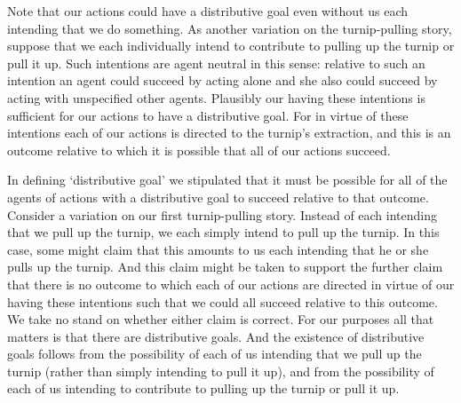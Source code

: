 \documentclass[12pt,\papersize]{extarticle}
\begin{document}

Note that our actions could have a distributive goal even without us each intending that we do something.
As another variation on the turnip-pulling story,
suppose that we each individually intend to 
	contribute to pulling up the turnip or pull it up.
Such intentions are agent neutral in this sense:
relative to such an intention an agent 
	could succeed by acting alone 
and
  she also could succeed by acting with unspecified other agents.
Plausibly our having these intentions is sufficient for our actions to have a distributive goal.
For in virtue of these intentions each of our actions is directed to the turnip's extraction,
and this is an outcome relative to which it is possible that all of our actions succeed.


In defining `distributive goal' we stipulated that it must be possible for all of the agents of actions with a distributive goal to succeed relative to that outcome.
Consider a variation on our first turnip-pulling story.
Instead of each intending that we pull up the turnip,
we each simply intend  to pull up the turnip.
In this case,
some might claim that
this amounts to us each intending that he or she pulls up the turnip.
And this claim might be taken to support the further claim that
there is no outcome to which each of our actions are directed
in virtue of our having these intentions
such that we could all succeed relative to this outcome.
We take no stand on whether either claim is correct.
For our purposes all that matters is that there are distributive goals.
And the existence of distributive goals follows from the possibility of each of us 
intending that we pull up the turnip
(rather than simply
intending to pull it up),
and from the possibility of each of us
intending to contribute to pulling up the turnip or pull it up.
\end{document}
